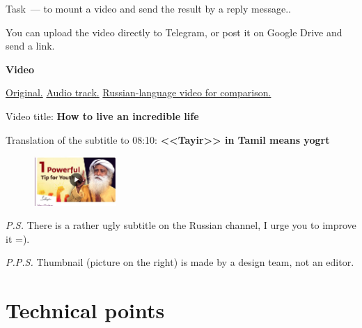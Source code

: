 \documentclass[
a4paper, %
12pt, %
article,
onecolumn, %
openany, %
]{memoir}
\begin{document}
Task~--- to mount a video and send the result
by a reply message..

You can upload the video directly to Telegram, or post
it on Google Drive and send a link.

\begin{center} \textbf{Video} \end{center}
\href{https://www.youtube.com/watch?v=9sGJUR7stzc}{Original.}
\quad
\href{https://drive.google.com/file/d/1Y6ECjMSvkaUFmNawIePfFvqS2ZnB3SPi/view?usp=sharing }{Audio track.}
\quad
\href{https://www.youtube.com/watch?v=Q3NYDF4JyTg}{Russian-language video for comparison.}

Video title: \textbf{How to live an incredible life}

Translation of the subtitle to 08:10: \textbf{<<Tayir>> in Tamil means yogrt}


\begin{figure}
\begin{center}
\includegraphics[width=0.28\textwidth]{thumbnail}
\end{center}
\end{figure}

\emph{P.S.} There is a rather ugly subtitle on the Russian channel, I urge you to improve it =).

\emph{P.P.S.} Thumbnail (picture on the right) is made by a design team, not an editor.


\newpage
\section{Technical points}
\end{document}
